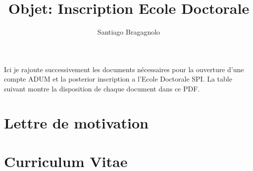 \documentclass[11pt]{article} %
\begin{document}

\date{}%

\author{Santiago Bragagnolo} %


\title{Objet: Inscription Ecole Doctorale }
\maketitle



 Ici je rajoute successivement les documents nécessaires pour la ouverture d'une compte ADUM et la posterior inscription a l'Ecole Doctorale SPI.
 La table suivant montre la disposition de chaque document dans ce PDF.


\tableofcontents

\section{Lettre de motivation}

 
\section{Curriculum Vitae}

\end{document}
